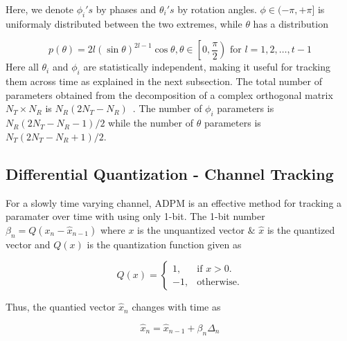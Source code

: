 \documentclass[conference]{IEEEtran}
\begin{document}
Here, we denote $\phi_{i}'s$ by phases and $\theta_{i}'s$ by rotation angles. $\phi \in (-\pi, + \pi]$ is uniformaly distributed between the two extremes\cite{4114278}, while $\theta$ has a distribution

\begin{equation}
p(\theta) = 2l(\sin\theta)^{2l-1}\cos\theta, \theta \in \left[0, \frac{\pi}{2}\right) \mbox{ for } l = 1,2,\ldots,t-1
\end{equation}
Here all $\theta_i$ and $\phi_i$ are statistically independent, making it useful for tracking them across time as explained in the next subsection. The total number of parameters obtained from the decomposition of a complex orthogonal matrix $N_{T} \times N_{R} $ is $N_{R}(2N_{T} - N_{R})$~\cite{4114278}. The number of $\phi_i$ parameters is $N_{R}(2N_{T} - N_{R}-1)/2$ while the number of $\theta$ parameters is $N_{T}(2N_{T} - N_{R}+1)/2$.




\subsection{Differential Quantization - Channel Tracking}
\label{quantiz}

For a slowly time varying channel, ADPM is an effective method for tracking a paramater over time with using only 1-bit. The 1-bit number $\beta_{n} = Q(x_{n} - \hat{x}_{n-1})$ where $x$ is the unquantized vector $\&$ $\hat{x}$ is the quantized vector and $Q(x)$ is the quantization function given as


\begin{equation}
  Q(x)=\begin{cases}
    1, & \text{if $x>0$}.\\
    -1, & \text{otherwise}.
  \end{cases}
\end{equation}

Thus, the quantied vector $\hat{x}_n$ changes with time as

\begin{equation}
\hat{x}_{n} = \hat{x}_{n-1} + \beta_{n}\Delta_{n}
\end{equation}
\end{document}
